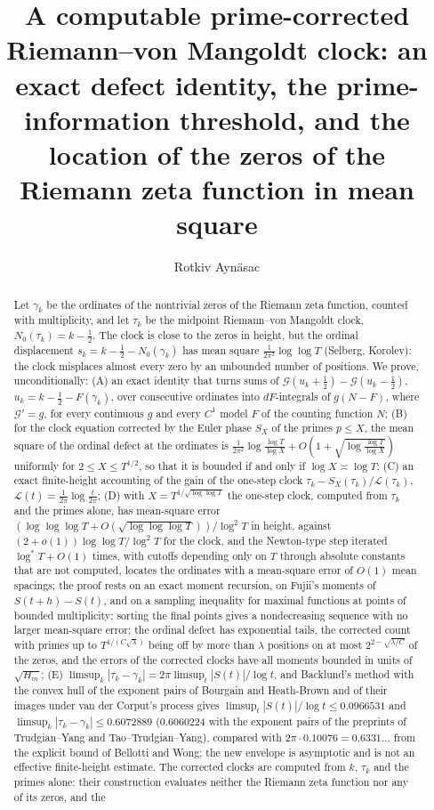\documentclass[preprint,12pt]{elsarticle}
\numberwithin{equation}{section}
\theoremstyle{plain}
\theoremstyle{definition}
\theoremstyle{remark}
\newcommand{\NO}{N_0}
\newcommand{\lL}{\mathcal L}
\begin{document}
\begin{frontmatter}
\title{A computable prime-corrected Riemann--von Mangoldt clock: an exact defect identity, the prime-information threshold, and the location of the zeros of the Riemann zeta function in mean square}
\author{Rotkiv Ayn\"asac}

\begin{abstract}
Let $\gamma_k$ be the ordinates of the nontrivial zeros of the Riemann zeta function, counted with multiplicity, and let $\tau_k$ be the midpoint Riemann--von Mangoldt clock, $\NO(\tau_k)=k-\frac12$. The clock is close to the zeros in height, but the ordinal displacement $s_k=k-\frac12-\NO(\gamma_k)$ has mean square $\frac1{2\pi^2}\log\log T$ (Selberg, Korolev): the clock misplaces almost every zero by an unbounded number of positions. We prove, unconditionally: (A) an exact identity that turns sums of $\mathcal G(u_k+\frac12)-\mathcal G(u_k-\frac12)$, $u_k=k-\frac12-F(\gamma_k)$, over consecutive ordinates into $dF$-integrals of $g(N-F)$, where $\mathcal G'=g$, for every continuous $g$ and every $C^1$ model $F$ of the counting function $N$; (B) for the clock equation corrected by the Euler phase $S_X$ of the primes $p\le X$, the mean square of the ordinal defect at the ordinates is $\frac1{2\pi^2}\log\frac{\log T}{\log X}+O(1+\sqrt{\log\frac{\log T}{\log X}})$ uniformly for $2\le X\le T^{1/2}$, so that it is bounded if and only if $\log X\asymp\log T$; (C) an exact finite-height accounting of the gain of the one-step clock $\tau_k-S_X(\tau_k)/\lL(\tau_k)$, $\lL(t)=\frac1{2\pi}\log\frac t{2\pi}$; (D) with $X=T^{1/\sqrt{\log\log T}}$ the one-step clock, computed from $\tau_k$ and the primes alone, has mean-square error $(\log\log\log T+O(\sqrt{\log\log\log T}))/\log^2T$ in height, against $(2+o(1))\log\log T/\log^2T$ for the clock, and the Newton-type step iterated $\log^*T+O(1)$ times, with cutoffs depending only on $T$ through absolute constants that are not computed, locates the ordinates with a mean-square error of $O(1)$ mean spacings; the proof rests on an exact moment recursion, on Fujii's moments of $S(t+h)-S(t)$, and on a sampling inequality for maximal functions at points of bounded multiplicity; sorting the final points gives a nondecreasing sequence with no larger mean-square error; the ordinal defect has exponential tails, the corrected count with primes up to $T^{1/(C\sqrt\lambda)}$ being off by more than $\lambda$ positions on at most $2^{2-\sqrt{\lambda/C}}$ of the zeros, and the errors of the corrected clocks have all moments bounded in units of $\sqrt{H_m}$; (E) $\limsup_k|\tau_k-\gamma_k|=2\pi\limsup_t|S(t)|/\log t$, and Backlund's method with the convex hull of the exponent pairs of Bourgain and Heath-Brown and of their images under van der Corput's process gives $\limsup_t|S(t)|/\log t\le0.0966531$ and $\limsup_k|\tau_k-\gamma_k|\le0.6072889$ ($0.6060224$ with the exponent pairs of the preprints of Trudgian--Yang and Tao--Trudgian--Yang), compared with $2\pi\cdot0.10076=0.6331\ldots$ from the explicit bound of Bellotti and Wong; the new envelope is asymptotic and is not an effective finite-height estimate. The corrected clocks are computed from $k$, $\tau_k$ and the primes alone: their construction evaluates neither the Riemann zeta function nor any of its zeros, and the 
\end{abstract}
\end{frontmatter}
\end{document}

